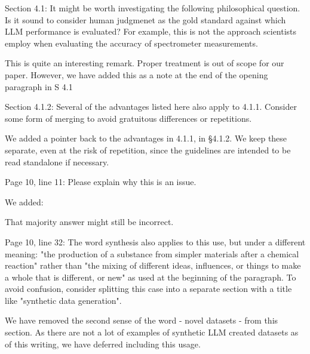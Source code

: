 \documentclass[12pt,english]{reviewresponse}
\begin{document}
\begin{revcomment}
    Section 4.1: It might be worth investigating the following philosophical question. Is it sound to consider human judgmenet as the gold standard against which LLM performance is evaluated? For example, this is not the approach scientists employ when evaluating the accuracy of spectrometer measurements.
\end{revcomment}
\begin{revresponse}
    This is quite an interesting remark. Proper treatment is out of scope for our paper. However, we have added this as a note at the end of the opening paragraph in S 4.1
\end{revresponse}

\begin{revcomment}
Section 4.1.2: Several of the advantages listed here also apply to 4.1.1. Consider some form of merging to avoid gratuitous differences or repetitions.
\end{revcomment}
\begin{revresponse}
    We added a pointer back to the advantages in 4.1.1, in \S 4.1.2. We keep these separate, even at the risk of repetition, since the guidelines are intended to be read standalone if necessary.
\end{revresponse}

\begin{revcomment}
Page 10, line 11: Please explain why this is an issue.
\end{revcomment}
\begin{revresponse}
    We added:
    \begin{changes}
    That majority answer might still be incorrect.
    \end{changes}
\end{revresponse}

\begin{revcomment}
Page 10, line 32: The word synthesis also applies to this use, but under a different meaning: "the production of a substance from simpler materials after a chemical reaction" rather than "the mixing of different ideas, influences, or things to make a whole that is different, or new" as used at the beginning of the paragraph. To avoid confusion, consider splitting this case into a separate section with a title like "synthetic data generation".
\end{revcomment}
\begin{revresponse}
    We have removed the second sense of the word - novel datasets - from this section. As there are not a lot of examples of synthetic LLM created datasets as of this writing, we have deferred including this usage.
\end{revresponse}
\end{document}
